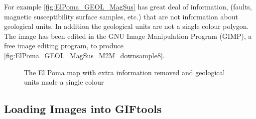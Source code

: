 For example \autoref{fig:ElPoma_GEOL_MagSus} has great deal of information, (faults, magnetic susceptibility surface samples, etc.) that are not information about geological units. In addition the geological units are not a single colour polygon. The image has been edited in the GNU Image Manipulation Program (GIMP), a free image editing program, to produce \autoref{fig:ElPoma_GEOL_MagSus_M2M_downsample8}. 

 \begin{figure} [h]
    \centering
    \caption{The El Poma map with extra information removed and geological units made a single colour}
    \label{fig:ElPoma_GEOL_MagSus_M2M_downsample8}
\end{figure}

\FloatBarrier
\subsection{Loading Images into GIFtools}
\label{subsec:Load Images into GIFtools}

